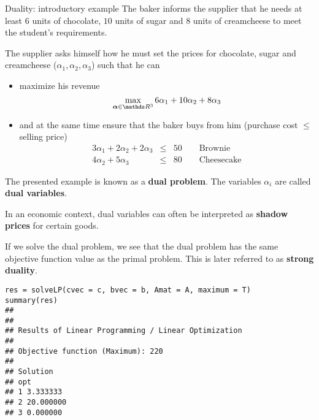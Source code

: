 \documentclass[11pt,compress,t,notes=noshow, xcolor=table]{beamer}
\begin{document}
\begin{vbframe}{Duality: introductory example}
\framebreak
\normalsize
The baker informs the supplier that he needs at least $6$ units of chocolate, $10$ units of sugar and $8$ units of creamcheese to meet the student's requirements.

\lz

The supplier asks himself how he must set the prices for chocolate, sugar and creamcheese ($\alpha_1, \alpha_2, \alpha_3$) such that he can

\begin{itemize}
\item maximize his revenue
$$
\max_{\bm{\alpha} \in \R^3}6 \alpha_1 + 10 \alpha_2 + 8 \alpha_3
$$
\item and at the same time ensure that the baker buys from him (purchase cost $\le$ selling price)
\begin{eqnarray*}
3\alpha_1 + 2\alpha_2 + 2\alpha_3 &\le& 50 \qquad \text{Brownie} \\
4\alpha_2 + 5\alpha_3 &\le& 80 \qquad \text{Cheesecake}
\end{eqnarray*}

\end{itemize}

\framebreak

The presented example is known as a \textbf{dual problem}. The variables $\alpha_i$ are called \textbf{dual variables}.

\lz

In an economic context, dual variables can often be interpreted as \textbf{shadow prices} for certain goods.

\lz

If we solve the dual problem, we see that the dual problem has the same objective function value as the primal problem. This is later referred to as \textbf{strong duality}.

%
\framebreak
\footnotesize
\begin{verbatim}
res = solveLP(cvec = c, bvec = b, Amat = A, maximum = T)
summary(res)
##
##
## Results of Linear Programming / Linear Optimization
##
## Objective function (Maximum): 220
##
## Solution
## opt
## 1 3.333333
## 2 20.000000
## 3 0.000000
\end{verbatim}





\end{vbframe}
\end{document}
